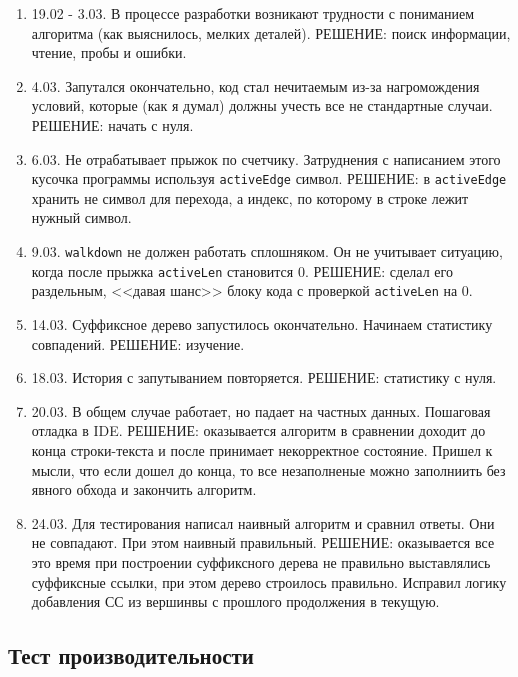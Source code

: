 \documentclass[12pt]{article}
\begin{document}
\begin{enumerate}
\item 19.02 - 3.03. В процессе разработки возникают трудности с пониманием алгоритма (как выяснилось, мелких деталей).
РЕШЕНИЕ: поиск информации, чтение, пробы и ошибки.

\item 4.03. Запутался окончательно, код стал нечитаемым из-за нагромождения условий, которые (как я думал) должны учесть все не стандартные случаи.
РЕШЕНИЕ: начать с нуля.

\item 6.03. Не отрабатывает прыжок по счетчику. Затруднения с написанием этого кусочка программы используя \verb|activeEdge| символ.
РЕШЕНИЕ: в \verb|activeEdge| хранить не символ для перехода, а индекс, по которому в строке лежит нужный символ.

\item 9.03. \verb|walkdown| не должен работать сплошняком. Он не учитывает ситуацию, когда после прыжка \verb|activeLen| становится 0.
РЕШЕНИЕ: сделал его раздельным, <<давая шанс>> блоку кода с проверкой \verb|activeLen| на 0.

\item 14.03. Суффиксное дерево запустилось окончательно. Начинаем статистику совпадений.
РЕШЕНИЕ: изучение.

\item 18.03. История с запутыванием повторяется.
РЕШЕНИЕ: статистику с нуля.

\item 20.03. В общем случае работает, но падает на частных данных. Пошаговая отладка в IDE.
РЕШЕНИЕ: оказывается алгоритм в сравнении доходит до конца строки-текста и после принимает некорректное состояние. Пришел к мысли, что если дошел до конца, то все незаполненые можно заполниить без явного обхода и закончить алгоритм.

\item 24.03. Для тестирования написал наивный алгоритм и сравнил ответы. Они не совпадают. При этом наивный правильный.
РЕШЕНИЕ: оказывается все это время при построении суффиксного дерева не правильно выставлялись суффиксные ссылки, при этом дерево строилось правильно. Исправил логику добавления СС из вершинвы с прошлого продолжения в текущую.
 
\end{enumerate}

\subsection*{Тест производительности}
\end{document}
